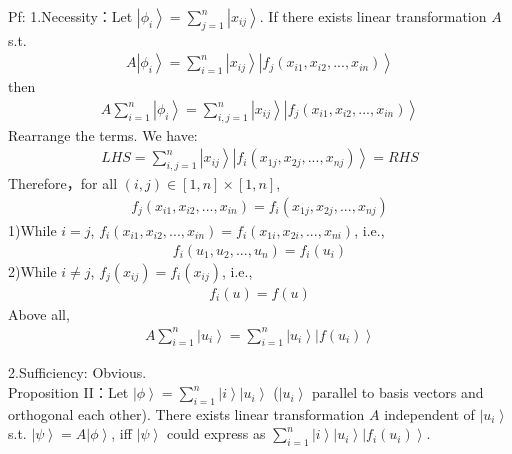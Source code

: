 \documentclass[%
 reprint,
 amsmath,amssymb,
pra,
]{revtex4-1}
\begin{document}
\noindent Pf: 1.Necessity：Let $\left|\phi_i\right\rangle = \sum_{j=1}^n \left|x_{ij}\right\rangle$. If there exists linear transformation $A$ s.t.
\begin{align*}
A\left|\phi_i\right\rangle = \sum_{i=1}^n\left|x_{ij}\right\rangle\left|f_{j}\left(x_{i1}, x_{i2}, ..., x_{in}\right)\right\rangle
\end{align*}
then
\begin{align*}
A\sum_{i=1}^{n}\left|\phi_i\right\rangle = \sum_{i, j=1}^n\left|x_{ij}\right\rangle\left|f_{j}\left(x_{i1}, x_{i2}, ..., x_{in}\right)\right\rangle
\end{align*}
Rearrange the terms. We have: 
\begin{align*}
LHS = \sum_{i, j=1}^n\left|x_{ij}\right\rangle\left|f_{i}\left(x_{1j}, x_{2j}, ..., x_{nj}\right)\right\rangle = RHS
\end{align*}
Therefore，for all $\left(i, j\right) \in \left[1, n\right]\times\left[1, n\right]$, 
\begin{align*}
f_{j}\left(x_{i1}, x_{i2}, ..., x_{in}\right) = f_{i}\left(x_{1j}, x_{2j}, ..., x_{nj}\right)
\end{align*}
1)While $i=j$, $f_{i}\left(x_{i1}, x_{i2}, ..., x_{in}\right) = f_{i}\left(x_{1i}, x_{2i}, ..., x_{ni}\right)$, i.e., 
\begin{align*}
f_i\left(u_1, u_2, ...,u_n\right) = f_i\left(u_i\right)
\end{align*}
2)While $i\neq j$, $f_j\left(x_{ij}\right) = f_i\left(x_{ij}\right)$, i.e., 
\begin{align*}
f_i\left(u\right) = f\left(u\right)
\end{align*}
Above all, 
\begin{align*}
A\sum_{i=1}^{n}\left|u_i\right\rangle = \sum_{i=1}^{n}\left|u_i\right\rangle\left|f\left(u_i\right)\right\rangle
\end{align*}


2.Sufficiency: Obvious.\\

\noindent Proposition II：Let $\left|\phi\right\rangle = \sum_{i=1}^n \left|i\right\rangle\left|u_i\right\rangle$ ($\left|u_i\right\rangle$ parallel to basis vectors and orthogonal each other). There exists 
linear transformation $A$ independent of $\left|u_{i}\right\rangle$ s.t. $\left|\psi\right\rangle = A\left|\phi\right\rangle$, iff $\left|\psi\right\rangle$ could express as $\sum_{i=1}^n \left|i\right\rangle\left|u_i\right\rangle\left|f_{i}\left(u_i\right)\right\rangle$.
\end{document}
